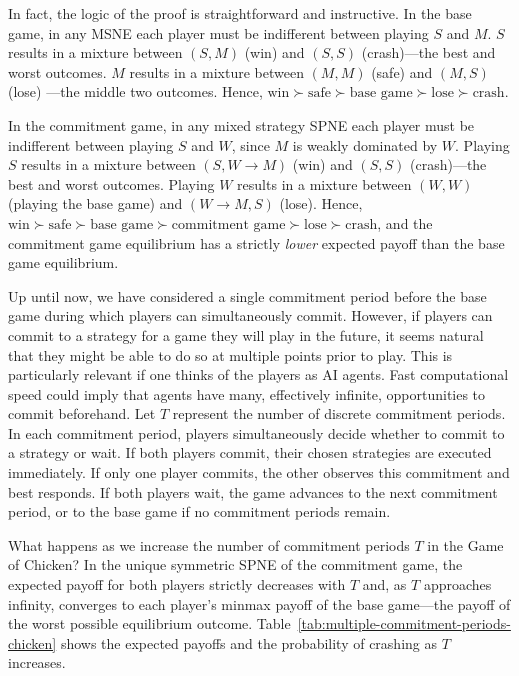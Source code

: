 \documentclass[letterpaper]{article}
\theoremstyle{definition}
\begin{document}

In fact, the logic of the proof is straightforward and instructive. In the base game, in any MSNE each player must be indifferent between playing $S$ and $M$. $S$ results in a mixture between $(S, M)$ (win) and $(S, S)$ (crash)—the best and worst outcomes. $M$ results in a mixture between $(M, M)$ (safe) and $(M, S)$ (lose) —the middle two outcomes. Hence, $\text{win} \succ \text{safe} \succ \text{base game} \succ \text{lose} \succ \text{crash}$.

In the commitment game, in any mixed strategy SPNE each player must be indifferent between playing $S$ and $W$, since $M$ is weakly dominated by $W$. Playing $S$ results in a mixture between $(S, W \to M)$ (win) and $(S, S)$ (crash)—the best and worst outcomes. Playing $W$ results in a mixture between $(W, W)$ (playing the base game) and $(W \to M, S)$ (lose). Hence, $\text{win} \succ \text{safe} \succ \text{base game} \succ \text{commitment game} \succ \text{lose} \succ \text{crash}$, and the commitment game equilibrium has a strictly \emph{lower} expected payoff than the base game equilibrium.

Up until now, we have considered a single commitment period before the base game during which players can simultaneously commit. However, if players can commit to a strategy for a game they will play in the future, it seems natural that they might be able to do so at multiple points prior to play. This is particularly relevant if one thinks of the players as AI agents. Fast computational speed could imply that agents have many, effectively infinite, opportunities to commit beforehand.
Let $T$ represent the number of discrete commitment periods. In each commitment period, players simultaneously decide whether to commit to a strategy or wait. If both players commit, their chosen strategies are executed immediately. If only one player commits, the other observes this commitment and best responds. If both players wait, the game advances to the next commitment period, or to the base game if no commitment periods remain. 


What happens as we increase the number of commitment periods $T$ in the Game of Chicken? In the unique symmetric SPNE of the commitment game, the expected payoff for both players strictly decreases with $T$ and, as $T$ approaches infinity, converges to each player's minmax payoff of the base game---the payoff of the worst possible equilibrium outcome. Table~\ref{tab:multiple-commitment-periods-chicken} shows the expected payoffs and the probability of crashing as $T$ increases.
\end{document}
